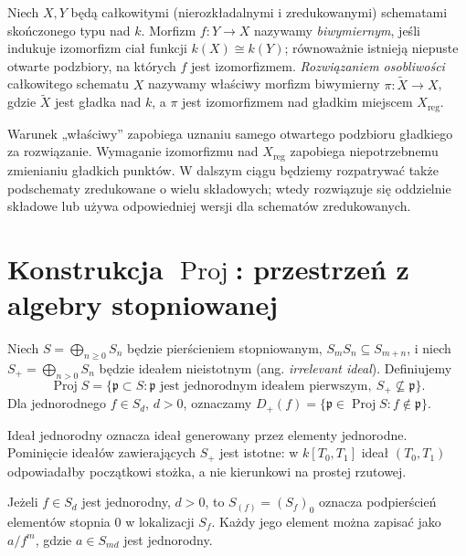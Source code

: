 \begin{definicja}
\label{def:ga5-resolution}
Niech $X,Y$ będą całkowitymi (nierozkładalnymi i zredukowanymi)
schematami skończonego typu nad $k$. Morfizm $f:Y\to X$
nazywamy \emph{biwymiernym}, jeśli indukuje izomorfizm ciał
funkcji $k(X)\cong k(Y)$; równoważnie istnieją niepuste
otwarte podzbiory, na których $f$ jest izomorfizmem.
\emph{Rozwiązaniem osobliwości} całkowitego schematu $X$
nazywamy właściwy morfizm biwymierny $\pi:\widetilde X\to X$,
gdzie $\widetilde X$ jest gładka nad $k$, a $\pi$ jest
izomorfizmem nad gładkim miejscem $X_{\mathrm{reg}}$.
\end{definicja}

Warunek „właściwy” zapobiega uznaniu samego otwartego
podzbioru gładkiego za rozwiązanie. Wymaganie izomorfizmu
nad $X_{\mathrm{reg}}$ zapobiega niepotrzebnemu zmienianiu
gładkich punktów. W dalszym ciągu będziemy rozpatrywać
także podschematy zredukowane o wielu składowych;
wtedy rozwiązuje się oddzielnie składowe lub używa
odpowiedniej wersji dla schematów zredukowanych.

\section{Konstrukcja \texorpdfstring{$\operatorname{Proj}$}{Proj}: przestrzeń z algebry stopniowanej}
\label{sec:ga5-proj}

\begin{definicja}
Niech $S=\bigoplus_{n\ge0}S_n$ będzie pierścieniem
stopniowanym, $S_mS_n\subseteq S_{m+n}$, i niech
$S_+=\bigoplus_{n>0}S_n$ będzie ideałem nieistotnym
(ang. \emph{irrelevant ideal}). Definiujemy
\[
 \operatorname{Proj}S=
 \{\mathfrak p\subset S:\mathfrak p\text{ jest jednorodnym ideałem
 pierwszym},\ S_+\not\subseteq\mathfrak p\}.
\]
Dla jednorodnego $f\in S_d$, $d>0$, oznaczamy
$D_+(f)=\{\mathfrak p\in\operatorname{Proj}S:f\notin\mathfrak p\}$.
\end{definicja}

Ideał jednorodny oznacza ideał generowany przez elementy
jednorodne. Pominięcie ideałów zawierających $S_+$ jest
istotne: w $k[T_0,T_1]$ ideał $(T_0,T_1)$ odpowiadałby
początkowi stożka, a nie kierunkowi na prostej rzutowej.

\begin{definicja}
Jeżeli $f\in S_d$ jest jednorodny, $d>0$, to
$S_{(f)}=(S_f)_0$ oznacza podpierścień elementów stopnia
$0$ w lokalizacji $S_f$. Każdy jego element można zapisać
jako $a/f^m$, gdzie $a\in S_{md}$ jest jednorodny.
\end{definicja}

